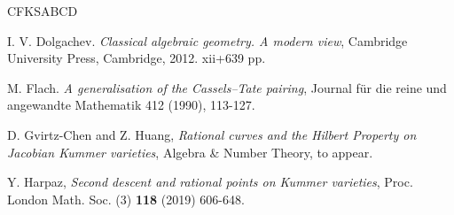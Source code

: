 \documentclass[10pt]{amsart}
\numberwithin{equation}{section}
\theoremstyle{remark}
\theoremstyle{definition}
\theoremstyle{definition}
\theoremstyle{definition}
\theoremstyle{definition}
\theoremstyle{definition}
\theoremstyle{definition}
\theoremstyle{definition}
\theoremstyle{definition}
\begin{document}
\begin{thebibliography}{CFKSABCD}

 

I. V. Dolgachev. \textit{Classical algebraic geometry. A modern view}, Cambridge University Press, Cambridge, 2012. xii+639 pp.



     
     M. Flach. \textit{A generalisation of the Cassels--Tate pairing}, Journal für die reine und angewandte Mathematik 412 (1990), 113-127.

     
% 
%              
%  
%
%             
 
    D. Gvirtz-Chen and Z. Huang, \textit{Rational curves and the Hilbert Property on Jacobian Kummer varieties}, Algebra \& Number Theory, to appear.  
 
 Y. Harpaz, \textit{Second descent and rational points on Kummer varieties}, Proc. London Math. Soc. (3)  \textbf{118} (2019) 606-648.
 
 

\end{thebibliography}
\end{document}
